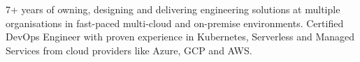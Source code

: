 
7+ years of owning, designing and delivering engineering solutions at multiple organisations in fast-paced multi-cloud and on-premise environments.
Certified DevOps Engineer with proven experience in Kubernetes, Serverless and Managed Services from cloud providers like Azure, GCP and AWS.